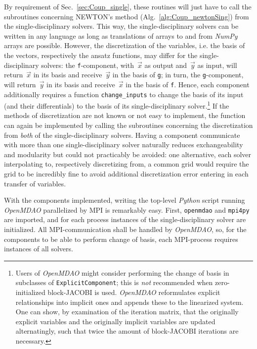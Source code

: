 \documentclass[10pt, ngerman, english,
twoside, open=right,
numbers=noenddot,
declaration=section,
abstract=section,
abstract=multiple,
abstract=notoc,
declaration=notoc,
cd=pale, 
chapterprefix=off, 
chapterpage=false, 
headingsvskip=-10em,
cdgeometry=custom, 
slantedgreek=on,
cdmath=on, 
cdfont=on,
ttfont=false,
mathswap=off,
]{tudscrreprt}
\numberwithin{equation}{chapter}
\renewcommand{\textsc}[1]{\uppercase{\mbox{#1}}}
\newcommand{\sidenote}[1]{
  \leavevmode %
  \marginpar{\hyphenpenalty=1000 \flushleft{\textcolor{HKS41}{#1}}}}
\begin{document}
By requirement of Sec.~\ref{sec:Coup_single}, these routines will just have to call the subroutines concerning \textsc{Newton}'s method (Alg.~\ref{alg:Coup_newtonSing}) from the single-disciplinary solvers. This way, the single-disciplinary solvers can be written in any language as long as translations of arrays to and from \textit{NumPy} arrays are possible. 
However, the discretization of the variables, i.e. the basis of the vectors, respectively the ansatz functions, may differ for the single-disciplinary solvers: the \texttt{f}-component, with~$\vec{x}$ as output and~$\vec{y}$ as input, will return~$\vec{x}$ in its basis and receive~$\vec{y}$ in the basis of \texttt{g}; in turn, the \texttt{g}-component, will return~$\vec{y}$ in its basis and receive~$\vec{x}$ in the basis of \texttt{f}.
Hence, each component additionally requires a function \texttt{change\_inputs} to change the basis of its input (and their differentials) to the basis of its single-disciplinary solver.\footnote{Users of \textit{OpenMDAO} might consider performing the change of basis in subclasses of \texttt{ExplicitComponent}; this is \emph{not} recommended when zero-initialized block-\textsc{Jacobi} is used. \textit{OpenMDAO} reformulates explicit relationships into implicit ones and appends these to the linearized system. One can show, by examination of the iteration matrix, that the originally explicit variables and the originally implicit variables are updated alternatingly, such that twice the amount of block-\textsc{Jacobi} iterations are necessary.} 
If the methods of discretization are not known or not easy to implement, the function can again be implemented by calling the subroutines concerning the discretization from \emph{both} of the single-disciplinary solvers. 
Having a component communicate with more than one single-disciplinary solver naturally reduces exchangeability and modularity but could not practicably be avoided: one alternative, each solver interpolating to, respectively discretizing from, a common grid would require the grid to be incredibly fine to avoid additional discretization error entering in each transfer of variables.\par
\sidenote{Top-Level Solver Code}With the components implemented, writing the top-level \textit{Python} script running \textit{OpenMDAO} parallelized by MPI is remarkably easy. First, \texttt{openmdao} and \texttt{mpi4py}~\mbox{\cite{mpi4py, mpi4pyDoc}} are imported, and for each process instances of the single-disciplinary solver are initialized. All MPI-communication shall be handled by \textit{OpenMDAO}, so, for the components to be able to perform change of basis, each MPI-process requires instances of all solvers.
\end{document}
